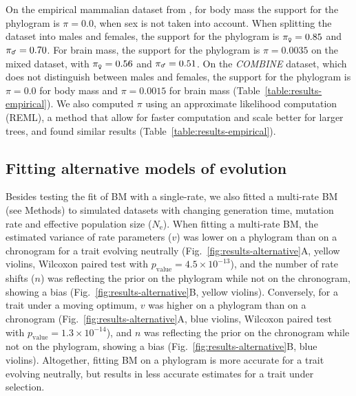 \documentclass{article}
\newcommand{\Ne}{N_{\text{e}}}
\newcommand{\PhyloSupport}{\pi}
\begin{document}
On the empirical mammalian dataset from \citet{tsuboi_breakdown_2018}, for body mass the support for the phylogram is $\PhyloSupport = 0.0$, when sex is not taken into account.
When splitting the dataset into males and females, the support for the phylogram is $\PhyloSupport_{\text{\Female}} = 0.85$ and $\PhyloSupport_{\text{\Male}} = 0.70$.
For brain mass, the support for the phylogram is $\PhyloSupport = 0.0035$ on the mixed dataset, with $\PhyloSupport_{\text{\Female}} = 0.56$ and $\PhyloSupport_{\text{\Male}} = 0.51$.
On the \textit{COMBINE} dataset, which does not distinguish between males and females, the support for the phylogram is $\PhyloSupport = 0.0$ for body mass and $\PhyloSupport = 0.0015$ for brain mass (Table~\ref{table:results-empirical}).
We also computed $\PhyloSupport$ using an approximate likelihood computation (REML), a method that allow for faster computation and scale better for larger trees, and found similar results (Table~\ref{table:results-empirical}).

\subsection*{Fitting alternative models of evolution}
Besides testing the fit of BM with a single-rate, we also fitted a multi-rate BM (see Methods) to simulated datasets with changing generation time, mutation rate and effective population size ($\Ne$).
When fitting a multi-rate BM, the estimated variance of rate parameters ($v$) was lower on a phylogram than on a chronogram for a trait evolving neutrally (Fig.~\ref{fig:results-alternative}A, yellow violins, Wilcoxon paired test with $p_{\text{value}}=4.5\times 10^{-13}$), and the number of rate shifts ($n$) was reflecting the prior on the phylogram while not on the chronogram, showing a bias (Fig.~\ref{fig:results-alternative}B, yellow violins).
Conversely, for a trait under a moving optimum, $v$ was higher on a phylogram than on a chronogram (Fig.~\ref{fig:results-alternative}A, blue violins, Wilcoxon paired test with  $p_{\text{value}}=1.3\times 10^{-14}$), and $n$ was reflecting the prior on the chronogram while not on the phylogram, showing a bias (Fig.~\ref{fig:results-alternative}B, blue violins).
Altogether, fitting BM on a phylogram is more accurate for a trait evolving neutrally, but results in less accurate estimates for a trait under selection.
\end{document}
